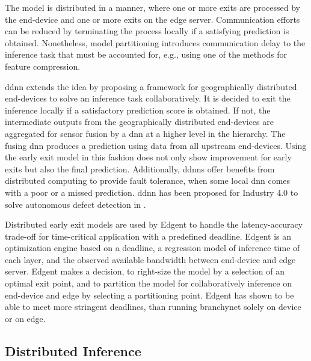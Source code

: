\begin{enumdescript}
	The model is distributed in a manner, where one or more exits are processed by the end-device and one or more exits on the edge server. Communication efforts can be reduced by terminating the process locally if a satisfying prediction is obtained. Nonetheless, model partitioning introduces communication delay to the inference task that must be accounted for, e.g., using one of the methods for feature compression.
	
	\gls{ddnn} \cite{teerapittayanon_distributed_2017} extends the idea by proposing a framework for geographically distributed end-devices to solve an inference task collaboratively. It is decided to exit the inference locally if a satisfactory prediction score is obtained. If not, the intermediate outputs from the geographically distributed end-devices are aggregated for sensor fusion by a \gls{dnn} at a higher level in the hierarchy. The fusing \gls{dnn} produces a prediction using data from all upstream end-devices. Using the early exit model in this fashion does not only show improvement for early exits but also the final prediction. Additionally, \gls{ddnn}s offer benefits from distributed computing to provide fault tolerance, when some local \gls{dnn} comes with a poor or a missed prediction. \gls{ddnn} has been proposed for Industry 4.0 to solve autonomous defect detection in \cite{li_deep_2018}. 
	
	Distributed early exit models are used by Edgent \cite{li_edge_2018} to handle the latency-accuracy trade-off for time-critical application with a predefined deadline. Edgent is an optimization engine based on a deadline, a regression model of inference time of each layer, and the observed available bandwidth between end-device and edge server. Edgent makes a decision, to right-size the model by a selection of an optimal exit point, and to partition the model for collaboratively inference on end-device and edge by selecting a partitioning point. Edgent has shown to be able to meet more stringent deadlines, than running \gls{branchynet} solely on device or on edge.
\end{enumdescript}

\subsection{Distributed Inference}


